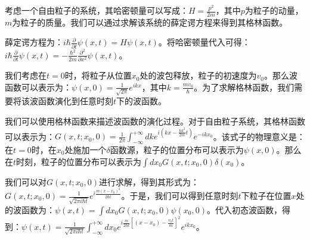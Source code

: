 
\begin{issues}
\issueDraft
\end{issues}

考虑一个自由粒子的系统，其哈密顿量可以写成：$H=\frac{p^2}{2m}$，其中$p$为粒子的动量，$m$为粒子的质量。我们可以通过求解该系统的薛定谔方程来得到其格林函数。

薛定谔方程为：$i\hbar\frac{\partial}{\partial t}\psi(x,t)=H\psi(x,t)$。将哈密顿量代入可得：$i\hbar\frac{\partial}{\partial t}\psi(x,t)=-\frac{\hbar^2}{2m}\frac{\partial^2}{\partial x^2}\psi(x,t)$。

我们考虑在$t=0$时，将粒子从位置$x_0$处的波包释放，粒子的初速度为$v_0$。那么波函数可以表示为：$\psi(x,0)=\frac{1}{\sqrt{2\pi}}e^{ikx}$，其中$k=\frac{mv_0}{\hbar}$。为了求解格林函数，我们需要将该波函数演化到任意时刻$t$下的波函数。

我们可以使用格林函数来描述波函数的演化过程。对于自由粒子系统，其格林函数可以表示为：$G(x,t;x_0,0)=\frac{1}{2\pi}\int_{-\infty}^{+\infty}dk e^{i(kx-\frac{\hbar k^2}{2m}t)}e^{-ikx_0}$。该式子的物理意义是：在$t=0$时，在$x_0$处施加一个$\delta$函数源，粒子的位置分布可以表示为$\psi(x,0)$。那么在$t$时刻，粒子的位置分布可以表示为$\int dx_0 G(x,t;x_0,0)\delta(x_0)$。

我们可以对$G(x,t;x_0,0)$进行求解，得到其形式为：$G(x,t;x_0,0)=\frac{1}{\sqrt{2\pi i\hbar t}}e^{i\frac{m(x-x_0)^2}{2\hbar t}}$。于是，我们可以得到任意时刻$t$下粒子在位置$x$处的波函数为：$\psi(x,t)=\int dx_0 G(x,t;x_0,0)\psi(x_0,0)$。代入初态波函数，得到：$\psi(x,t)=\frac{1}{\sqrt{2\pi i\hbar t}}\int_{-\infty}^{+\infty}dx_0 e^{i\frac{m}{2\hbar t}[(x-x_0)-\frac{v_0t}{m}]^2}e^{ikx_0}$。
